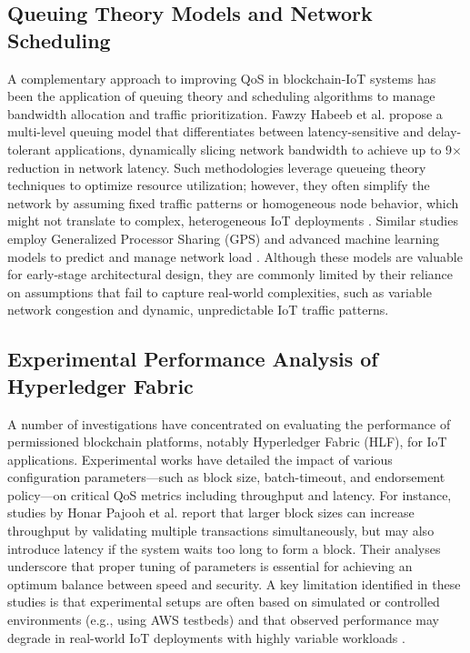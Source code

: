 \documentclass[12pt,onecolumn]{IEEEtran} %
\begin{document}
\subsection*{Queuing Theory Models and Network Scheduling}
A complementary approach to improving QoS in blockchain-IoT systems has been the application of queuing theory and scheduling algorithms to manage bandwidth allocation and traffic prioritization. Fawzy Habeeb et al. \cite{habeeb2022dynamicbandwidthslicing} propose a multi-level queuing model that differentiates between latency-sensitive and delay-tolerant applications, dynamically slicing network bandwidth to achieve up to 9$\times$ reduction in network latency. Such methodologies leverage queueing theory techniques to optimize resource utilization; however, they often simplify the network by assuming fixed traffic patterns or homogeneous node behavior, which might not translate to complex, heterogeneous IoT deployments \cite{habeeb2022dynamicbandwidthslicing}. Similar studies employ Generalized Processor Sharing (GPS) and advanced machine learning models to predict and manage network load \cite{zhang2024ondemandcentralizedresource}. Although these models are valuable for early-stage architectural design, they are commonly limited by their reliance on assumptions that fail to capture real-world complexities, such as variable network congestion and dynamic, unpredictable IoT traffic patterns.

\subsection*{Experimental Performance Analysis of Hyperledger Fabric}
A number of investigations have concentrated on evaluating the performance of permissioned blockchain platforms, notably Hyperledger Fabric (HLF), for IoT applications. Experimental works \cite{pajooh2022experimentalperformanceanalysis} have detailed the impact of various configuration parameters---such as block size, batch-timeout, and endorsement policy---on critical QoS metrics including throughput and latency. For instance, studies by Honar Pajooh et al. \cite{pajooh2022experimentalperformanceanalysis} report that larger block sizes can increase throughput by validating multiple transactions simultaneously, but may also introduce latency if the system waits too long to form a block. Their analyses underscore that proper tuning of parameters is essential for achieving an optimum balance between speed and security. A key limitation identified in these studies is that experimental setups are often based on simulated or controlled environments (e.g., using AWS testbeds) and that observed performance may degrade in real-world IoT deployments with highly variable workloads \cite{pajooh2022experimentalperformanceanalysis}.
\end{document}
